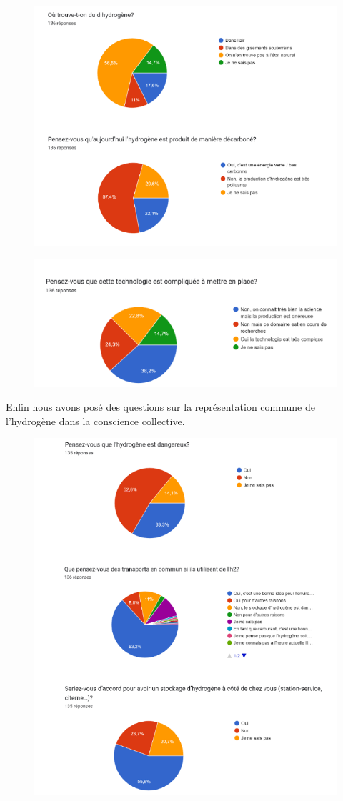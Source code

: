 \documentclass[11pt,french,a4paper]{article}
\begin{document}
\begin{figure}[h]
\centering
\includegraphics[width=0.8\linewidth]{image/annexe/annexeacceptabilite/graph2ii.png}
\end{figure}

\begin{figure}[h]
\centering
\includegraphics[width=0.8\linewidth]{image/annexe/annexeacceptabilite/graph2iii.png}
\end{figure}

Enfin nous avons posé des questions sur la représentation commune de l’hydrogène dans la conscience collective.


\begin{figure}[h]
\centering
\includegraphics[width=0.8\linewidth]{image/annexe/annexeacceptabilite/graph3.png}
\end{figure}
\end{document}
